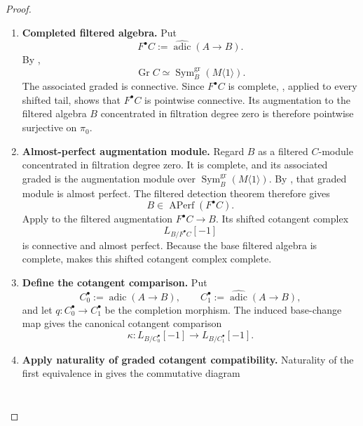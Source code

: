 \begin{proof}
\leavevmode
\begin{enumerate}[label=\textup{(\arabic*)}]
    \item \textbf{Completed filtered algebra.}
    Put
    \[
        F^\bullet C:=\widehat{\operatorname{adic}}(A\to B).
    \]
    By ,
    \[
        \operatorname{Gr}C
        \simeq
        \operatorname{Sym}^{\mathrm{gr}}_B(M\langle1\rangle).
    \]
    The associated graded is connective. Since \(F^\bullet C\) is complete,
    , applied to every shifted tail, shows
    that \(F^\bullet C\) is pointwise connective. Its augmentation to the filtered
    algebra \(B\) concentrated in filtration degree zero is therefore pointwise surjective on
    \(\pi_0\).
    \item \textbf{Almost-perfect augmentation module.}
    Regard \(B\) as a filtered \(C\)-module concentrated in filtration degree zero. It is
    complete, and its associated graded is the augmentation module over
    \(\operatorname{Sym}^{\mathrm{gr}}_B(M\langle1\rangle)\). By
    , that graded module is
    almost perfect. The filtered detection theorem
     therefore gives
    \[
        B\in\operatorname{APerf}(F^\bullet C).
    \]
    Apply  to the filtered augmentation
    \(F^\bullet C\to B\). Its shifted cotangent complex
    \[
        L_{B/F^\bullet C}[-1]
    \]
    is connective and almost perfect. Because the base filtered algebra is
    complete,  makes this shifted cotangent complex
    complete.
    \item \textbf{Define the cotangent comparison.}
    Put
    \[
        C_0^\bullet:=\operatorname{adic}(A\to B),
        \qquad
        C_1^\bullet:=\widehat{\operatorname{adic}}(A\to B),
    \]
    and let \(q:C_0^\bullet\to C_1^\bullet\) be the completion morphism. The
    induced base-change map gives the canonical cotangent comparison
    \[
        \kappa:
        L_{B/C_0^\bullet}[-1]
        \longrightarrow
        L_{B/C_1^\bullet}[-1].
    \]
    \item \textbf{Apply naturality of graded cotangent compatibility.}
    Naturality of the first equivalence in
     gives the commutative diagram
    \[
    \begin{tikzcd}[column sep=huge,row sep=large]

\end{tikzcd}\]
\end{enumerate}
\end{proof}
